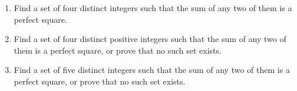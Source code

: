 \begin{enumerate}
\item[(a)] Find a set of four distinct integers such that the sum of any two of them is a perfect square.
\item[(b)] Find a set of four distinct positive integers such that the sum of any two of them is a perfect square, or prove that no such set exists.
\item[(c)] Find a set of five distinct integers such that the sum of any two of them is a perfect square, or prove that no such set exists.
\end{enumerate}
